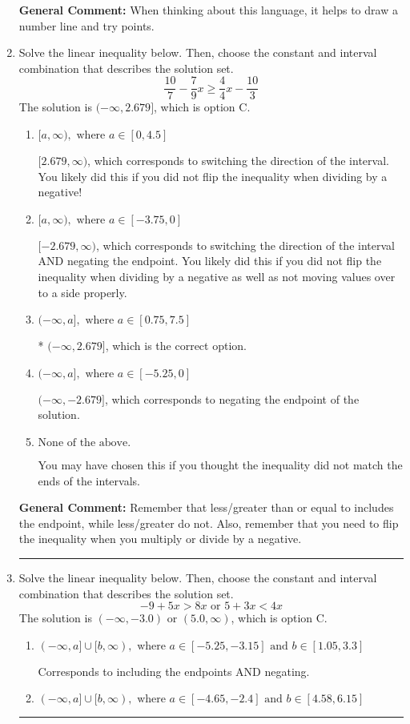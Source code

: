 \documentclass{extbook}[14pt]
\newcommand{\litem}[1]{\item #1

\rule{\textwidth}{0.4pt}}
\begin{document}
\begin{enumerate}
{\textbf{General Comment:} When thinking about this language, it helps to draw a number line and try points.
}
\litem{
Solve the linear inequality below. Then, choose the constant and interval combination that describes the solution set.
\[ \frac{10}{7} - \frac{7}{9} x \geq \frac{4}{4} x - \frac{10}{3} \]The solution is \( (-\infty, 2.679] \), which is option C.\begin{enumerate}[label=\Alph*.]
\item \( [a, \infty), \text{ where } a \in [0, 4.5] \)

 $[2.679, \infty)$, which corresponds to switching the direction of the interval. You likely did this if you did not flip the inequality when dividing by a negative!
\item \( [a, \infty), \text{ where } a \in [-3.75, 0] \)

 $[-2.679, \infty)$, which corresponds to switching the direction of the interval AND negating the endpoint. You likely did this if you did not flip the inequality when dividing by a negative as well as not moving values over to a side properly.
\item \( (-\infty, a], \text{ where } a \in [0.75, 7.5] \)

* $(-\infty, 2.679]$, which is the correct option.
\item \( (-\infty, a], \text{ where } a \in [-5.25, 0] \)

 $(-\infty, -2.679]$, which corresponds to negating the endpoint of the solution.
\item \( \text{None of the above}. \)

You may have chosen this if you thought the inequality did not match the ends of the intervals.
\end{enumerate}

\textbf{General Comment:} Remember that less/greater than or equal to includes the endpoint, while less/greater do not. Also, remember that you need to flip the inequality when you multiply or divide by a negative.
}
\litem{
Solve the linear inequality below. Then, choose the constant and interval combination that describes the solution set.
\[ -9 + 5 x > 8 x \text{ or } 5 + 3 x < 4 x \]The solution is \( (-\infty, -3.0) \text{ or } (5.0, \infty) \), which is option C.\begin{enumerate}[label=\Alph*.]
\item \( (-\infty, a] \cup [b, \infty), \text{ where } a \in [-5.25, -3.15] \text{ and } b \in [1.05, 3.3] \)

Corresponds to including the endpoints AND negating.
\item \( (-\infty, a] \cup [b, \infty), \text{ where } a \in [-4.65, -2.4] \text{ and } b \in [4.58, 6.15] \)


\end{enumerate}}
\end{enumerate}
\end{document}
